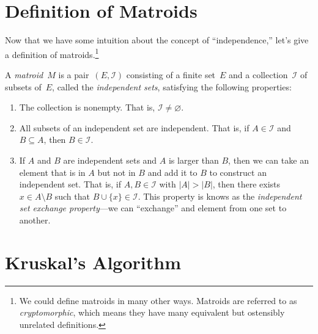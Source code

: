 \documentclass[twoside]{article}
\newcommand{\I}{\mathcal{I}}
\begin{document}
\section{Definition of Matroids}

Now that we have some intuition about the concept of ``independence,'' let's give a definition of matroids.\footnote{
  We could define matroids in many other ways.
  Matroids are referred to as \emph{cryptomorphic}, which means they have many equivalent but ostensibly unrelated definitions.}
\begin{defn}[Matroid]
  A \emph{matroid}~$M$ is a pair~$(E, \I)$ consisting of a finite set~$E$ and a collection~$\I$ of subsets of~$E$, called the \emph{independent sets}, satisfying the following properties:
  \begin{enumerate}
    \item The collection is nonempty.
      That is, ${\I \ne \varnothing}$.
    \item All subsets of an independent set are independent.
      That is, if ${A \in \I}$ and ${B \subseteq A}$, then ${B \in \I}$.
    \item If $A$ and $B$ are independent sets and $A$ is larger than $B$, then we can take an element that is in $A$ but not in $B$ and add it to $B$ to construct an independent set.
    That is, if ${A, B \in \I}$ with ${|A| > |B|}$, then there exists ${x \in A \setminus B}$ such that ${B \cup \{x\} \in \I}$.
    This property is knows as the \emph{independent set exchange property}---we can ``exchange'' and element from one set to another.
  \end{enumerate}
\end{defn}

\section{Kruskal's Algorithm}
\end{document}
